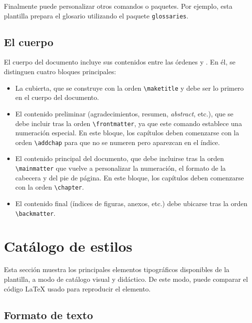 Finalmente puede personalizar otros comandos o paquetes. Por ejemplo, esta plantilla prepara el glosario utilizando el paquete \lstinline|glossaries|.

\subsection{El cuerpo}

El cuerpo del documento incluye sus contenidos entre las órdenes \lstinline|| y \lstinline||. En él, se distinguen cuatro bloques principales: 
\begin{itemize}\itemsep 0em
    \item La cubierta, que se construye con la orden \lstinline{\maketitle} y debe ser lo primero en el cuerpo del documento.
    \item El contenido preliminar (agradecimientos, resumen, \textit{abstract}, etc.), que se debe incluir tras la orden \lstinline{\frontmatter}, ya que este comando establece una numeración especial. En este bloque, los capítulos deben comenzarse con la orden \lstinline{\addchap} para que no se numeren pero aparezcan en el índice.
    \item El contenido principal del documento, que debe incluirse tras la orden \lstinline{\mainmatter} que vuelve a personalizar la numeración, el formato de la cabecera y del pie de página. En este bloque, los capítulos deben comenzarse con la orden \lstinline{\chapter}.
    \item El contenido final (índices de figuras, anexos, etc.) debe ubicarse tras la orden \lstinline{\backmatter}.
\end{itemize}

\section{Catálogo de estilos}

Esta sección muestra los principales elementos tipográficos disponibles de la plantilla, a modo de catálogo visual y didáctico. De este modo, puede comparar el código \LaTeX{} usado para reproducir el elemento. 

\subsection{Formato de texto}

